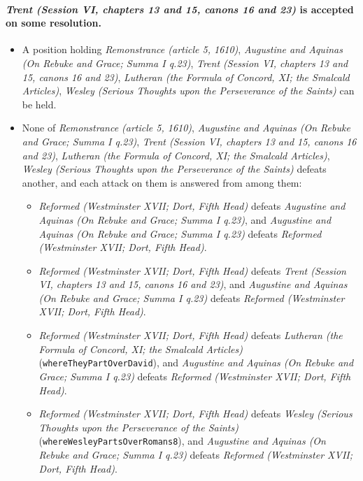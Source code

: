 \documentclass[11pt]{article}
\begin{document}
\paragraph{\emph{Trent (Session VI, chapters 13 and 15, canons 16 and 23)} is accepted on some resolution.}
\begin{itemize}
\item A position holding \emph{Remonstrance (article 5, 1610)}, \emph{Augustine and Aquinas (On Rebuke and Grace; Summa I q.23)}, \emph{Trent (Session VI, chapters 13 and 15, canons 16 and 23)}, \emph{Lutheran (the Formula of Concord, XI; the Smalcald Articles)}, \emph{Wesley (Serious Thoughts upon the Perseverance of the Saints)} can be held.
\item None of \emph{Remonstrance (article 5, 1610)}, \emph{Augustine and Aquinas (On Rebuke and Grace; Summa I q.23)}, \emph{Trent (Session VI, chapters 13 and 15, canons 16 and 23)}, \emph{Lutheran (the Formula of Concord, XI; the Smalcald Articles)}, \emph{Wesley (Serious Thoughts upon the Perseverance of the Saints)} defeats another, and each attack on them is answered from among them:
\begin{itemize}
\item \emph{Reformed (Westminster XVII; Dort, Fifth Head)} defeats \emph{Augustine and Aquinas (On Rebuke and Grace; Summa I q.23)}, and \emph{Augustine and Aquinas (On Rebuke and Grace; Summa I q.23)} defeats \emph{Reformed (Westminster XVII; Dort, Fifth Head)}.
\item \emph{Reformed (Westminster XVII; Dort, Fifth Head)} defeats \emph{Trent (Session VI, chapters 13 and 15, canons 16 and 23)}, and \emph{Augustine and Aquinas (On Rebuke and Grace; Summa I q.23)} defeats \emph{Reformed (Westminster XVII; Dort, Fifth Head)}.
\item \emph{Reformed (Westminster XVII; Dort, Fifth Head)} defeats \emph{Lutheran (the Formula of Concord, XI; the Smalcald Articles)} (\texttt{where\allowbreak{}They\allowbreak{}Part\allowbreak{}Over\allowbreak{}David}), and \emph{Augustine and Aquinas (On Rebuke and Grace; Summa I q.23)} defeats \emph{Reformed (Westminster XVII; Dort, Fifth Head)}.
\item \emph{Reformed (Westminster XVII; Dort, Fifth Head)} defeats \emph{Wesley (Serious Thoughts upon the Perseverance of the Saints)} (\texttt{where\allowbreak{}Wesley\allowbreak{}Parts\allowbreak{}Over\allowbreak{}Romans8}), and \emph{Augustine and Aquinas (On Rebuke and Grace; Summa I q.23)} defeats \emph{Reformed (Westminster XVII; Dort, Fifth Head)}.
\end{itemize}
\end{itemize}
\end{document}
